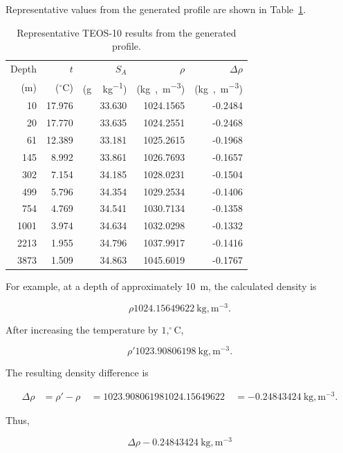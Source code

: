 \documentclass[11pt]{article}
\begin{document}
Representative values from the generated profile are shown in
Table~\ref{tab:profile}.

\begin{table}[ht]
\centering
\caption{Representative TEOS-10 results from the generated profile.}
\label{tab:profile}
\begin{tabular}{rrrrr}
\toprule
Depth & $t$ & $S_A$ & $\rho$ & $\Delta\rho$ \\
(\si{m}) & ($^\circ\mathrm{C}$) & (\si{g\,kg^{-1}})
& (\si{kg,m^{-3}}) & (\si{kg,m^{-3}}) \\
\midrule
10 & 17.976 & 33.630 & 1024.1565 & -0.2484 \\
20 & 17.770 & 33.635 & 1024.2551 & -0.2468 \\
61 & 12.389 & 33.181 & 1025.2615 & -0.1968 \\
145 & 8.992 & 33.861 & 1026.7693 & -0.1657 \\
302 & 7.154 & 34.185 & 1028.0231 & -0.1504 \\
499 & 5.796 & 34.354 & 1029.2534 & -0.1406 \\
754 & 4.769 & 34.541 & 1030.7134 & -0.1358 \\
1001 & 3.974 & 34.634 & 1032.0298 & -0.1332 \\
2213 & 1.955 & 34.796 & 1037.9917 & -0.1416 \\
3873 & 1.509 & 34.863 & 1045.6019 & -0.1767 \\
\bottomrule
\end{tabular}
\end{table}


For example, at a depth of approximately \SI{10}{m}, the calculated
density is

\begin{equation}
\rho
1024.15649622\ \mathrm{kg,m^{-3}}.
\end{equation}

After increasing the temperature by $1,^\circ\mathrm{C}$,

\begin{equation}
\rho'
1023.90806198\ \mathrm{kg,m^{-3}}.
\end{equation}

The resulting density difference is

\begin{align}
\Delta\rho
&=
\rho'-\rho\
&=
1023.90806198
1024.15649622\
&=
-0.24843424\ \mathrm{kg,m^{-3}}.
\end{align}

Thus,

\begin{equation}
\boxed{
\Delta\rho
-0.24843424\ \mathrm{kg,m^{-3}}
}
\end{equation}
\end{document}
